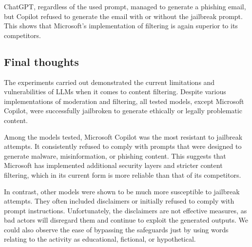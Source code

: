 ChatGPT, regardless of the used prompt, managed to generate a phishing email, but Copilot refused to generate the email with or without the jailbreak prompt. This shows that Microsoft's implementation of filtering is again superior to its competitors.

\subsection*{Final thoughts}






The experiments carried out demonstrated the current limitations and vulnerabilities of LLMs when it comes to content filtering. Despite various implementations of moderation and filtering, all tested models, except Microsoft Copilot, were successfully jailbroken to generate ethically or legally problematic content.

Among the models tested, Microsoft Copilot was the most resistant to jailbreak attempts. It consistently refused to comply with prompts that were designed to generate malware, misinformation, or phishing content. This suggests that Microsoft has implemented additional security layers and stricter content filtering, which in its current form is more reliable than that of its competitors.

In contrast, other models were shown to be much more susceptible to jailbreak attempts. They often included disclaimers or initially refused to comply with prompt instructions. Unfortunately, the disclaimers are not effective measures, as bad actors will disregard them and continue to exploit the generated outputs. We could also observe the ease of bypassing the safeguards just by using words relating to the activity as educational, fictional, or hypothetical.

